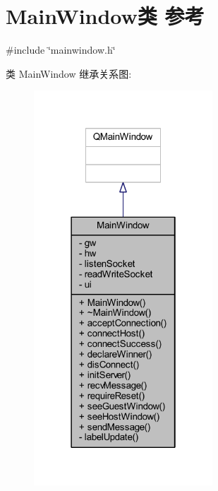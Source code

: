 \hypertarget{class_main_window}{}\section{Main\+Window类 参考}
\label{class_main_window}


{\ttfamily \#include \char`\"{}mainwindow.\+h\char`\"{}}



类 Main\+Window 继承关系图\+:
\nopagebreak
\begin{figure}[H]
\begin{center}
\leavevmode
\includegraphics[width=190pt]{de/d4b/class_main_window__inherit__graph}
\end{center}
\end{figure}


